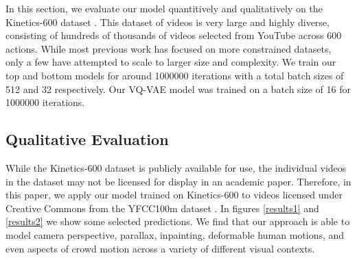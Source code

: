 \documentclass{article}
\begin{document}
In this section, we evaluate our model quantitively and qualitatively on the Kinetics-600 dataset \cite{Kinetics600}. This dataset of videos is very large and highly diverse, consisting of hundreds of thousands of videos selected from YouTube across 600 actions. While most previous work has focused on more constrained datasets, only a few \cite{clark2020adversarial, luc2020, WeissenbornTU20} have attempted to scale to larger size and complexity. We train our top and bottom models for around 1000000 iterations with a total batch sizes of 512 and 32 respectively. Our VQ-VAE model was trained on a batch size of 16 for 1000000 iterations. 

\subsection{Qualitative Evaluation}
While the Kinetics-600 dataset is publicly available for use, the individual videos in the dataset may not be licensed for display in an academic paper. Therefore, in this paper, we apply our model trained on Kinetics-600 to videos licensed under Creative Commons from the YFCC100m dataset \cite{yfc100m}. In figures \ref{results1} and \ref{results2} we show some selected predictions. We find that our approach is able to model camera perspective, parallax, inpainting, deformable human motions, and even aspects of crowd motion across a variety of different visual contexts. 
\end{document}
